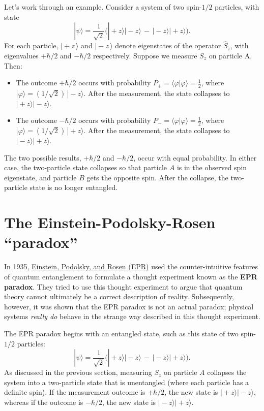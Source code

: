 \documentclass[pra,12pt]{revtex4}
\begin{document}
Let's work through an example.  Consider a system of two spin-$1/2$
particles, with state
\begin{equation}
  |\psi\rangle = \frac{1}{\sqrt{2}} \Big(|\!+\!z\rangle|\!-\!z\rangle \,-\, |\!-\!z\rangle|\!+\!z\rangle\Big).
\end{equation}
For each particle, $|\!+\!z\,\rangle$ and $|\!-\!z\,\rangle$ denote
eigenstates of the operator $\hat{S}_z$, with eigenvalues $+\hbar/2$
and $-\hbar/2$ respectively.  Suppose we measure $S_z$ on particle A.
Then:
\begin{itemize}
\item The outcome $+\hbar/2$ occurs with probability $P_+ = \langle
  \varphi|\varphi\rangle = \frac{1}{2}$, where $|\varphi\rangle =
  (1/\sqrt{2})\,|\!-\!z\rangle$.  After the measurement, the state
  collapses to $|\!+\!z\rangle |\!-\!z\rangle$.

\item The outcome $-\hbar/2$ occurs with probability $P_- = \langle
  \varphi|\varphi\rangle = \frac{1}{2}$, where $|\varphi\rangle =
  (1/\sqrt{2})\,|\!+\!z\rangle$.  After the measurement, the state
  collapses to $|\!-\!z\rangle |\!+\!z\rangle$.
\end{itemize}
The two possible results, $+\hbar/2$ and $-\hbar/2$, occur with equal
probability.  In either case, the two-particle state collapses so that
particle $A$ is in the observed spin eigenstate, and particle $B$
gets the opposite spin.  After the collapse, the two-particle state is
no longer entangled.

\section{The Einstein-Podolsky-Rosen ``paradox''}

In 1935, \hyperref[cite:epr]{Einstein, Podolsky, and Rosen (EPR)} used
the counter-intuitive features of quantum entanglement to formulate a
thought experiment known as the \textbf{EPR paradox}.  They tried to
use this thought experiment to argue that quantum theory cannot
ultimately be a correct description of reality.  Subsequently,
however, it was shown that the EPR paradox is not an actual paradox;
physical systems \textit{really do} behave in the strange way
described in this thought experiment.

The EPR paradox begins with an entangled state, such as
this state of two spin-$1/2$ particles:
\begin{equation}
  |\psi\rangle = \frac{1}{\sqrt{2}} \Big(|\!+\!z\rangle|\!-\!z\rangle \,-\, |\!-\!z\rangle|\!+\!z\rangle\Big).
\end{equation}
As discussed in the previous section, measuring $S_z$ on particle $A$
collapses the system into a two-particle state that is unentangled
(where each particle has a definite spin).  If the measurement outcome
is $+\hbar/2$, the new state is $|\!+\!z\rangle |\!-\!z\rangle$,
whereas if the outcome is $-\hbar/2$, the new state is
$|\!-\!z\rangle|\!+\!z\rangle$.
\end{document}
